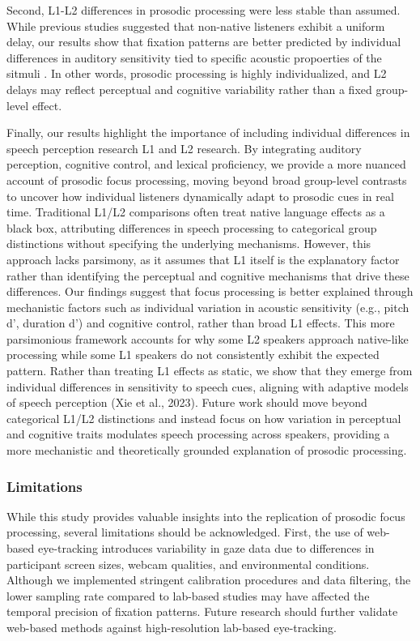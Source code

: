 Second, L1-L2 differences in prosodic processing were less stable than assumed. While previous studies suggested that non-native listeners exhibit a uniform delay, our results show that fixation patterns are better predicted by individual differences in auditory sensitivity tied to specific acoustic propoerties of the sitmuli \cite{xie2023adaptive}. In other words, prosodic processing is highly individualized, and L2 delays may reflect perceptual and cognitive variability rather than a fixed group-level effect.

Finally, our results highlight the importance of including individual differences in speech perception research L1 and L2 research. By integrating auditory perception, cognitive control, and lexical proficiency, we provide a more nuanced account of prosodic focus processing, moving beyond broad group-level contrasts to uncover how individual listeners dynamically adapt to prosodic cues in real time. Traditional L1/L2 comparisons often treat native language effects as a black box, attributing differences in speech processing to categorical group distinctions without specifying the underlying mechanisms. However, this approach lacks parsimony, as it assumes that L1 itself is the explanatory factor rather than identifying the perceptual and cognitive mechanisms that drive these differences. Our findings suggest that focus processing is better explained through mechanistic factors such as individual variation in acoustic sensitivity (e.g., pitch d$’$, duration d$’$) and cognitive control, rather than broad L1 effects. This more parsimonious framework accounts for why some L2 speakers approach native-like processing while some L1 speakers do not consistently exhibit the expected pattern. Rather than treating L1 effects as static, we show that they emerge from individual differences in sensitivity to speech cues, aligning with adaptive models of speech perception (Xie et al., 2023). Future work should move beyond categorical L1/L2 distinctions and instead focus on how variation in perceptual and cognitive traits modulates speech processing across speakers, providing a more mechanistic and theoretically grounded explanation of prosodic processing.


\subsubsection{Limitations}

While this study provides valuable insights into the replication of prosodic focus processing, several limitations should be acknowledged. First, the use of web-based eye-tracking introduces variability in gaze data due to differences in participant screen sizes, webcam qualities, and environmental conditions. Although we implemented stringent calibration procedures and data filtering, the lower sampling rate compared to lab-based studies may have affected the temporal precision of fixation patterns. Future research should further validate web-based methods against high-resolution lab-based eye-tracking.

